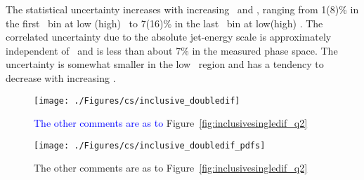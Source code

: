 The statistical uncertainty increases with increasing \etjetb~and \qsq, ranging from 1(8)\% in the first \qsq~bin at low (high) \etjetb~to 7(16)\% in the last \qsq~bin at low(high) \etjetb. The correlated uncertainty due to the absolute jet-energy scale is approximately independent of \etjetb~and is less than about 7\% in the measured phase space. The uncertainty is somewhat smaller in the low \etjetb~region and has a tendency to decrease with increasing \qsq.
\begin{figure}[p]
	\centering
		\texttt{[image: ./Figures/cs/inclusive\_doubledif]}
	\caption{\textcolor{blue}{The other comments are as to} Figure~\ref{fig:inclusivesingledif_q2}}
	\label{fig:inclusive_doubledif}
\end{figure}


\begin{figure}[p]
	\centering
		\texttt{[image: ./Figures/cs/inclusive\_doubledif\_pdfs]}
  \caption{The other comments are as to Figure~\ref{fig:inclusivesingledif_q2}}
	\label{fig:inclusive_doubledif_rel}
\end{figure}

